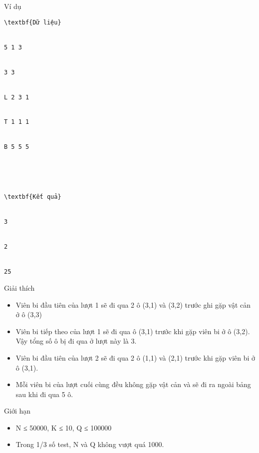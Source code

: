 Ví dụ
\begin{verbatim}
\textbf{Dữ liệu}


5 1 3


3 3


L 2 3 1


T 1 1 1


B 5 5 5





\textbf{Kết quả}


3


2


25\end{verbatim}
Giải thích
\begin{itemize}
	\item     Viên bi đầu tiên của lượt 1 sẽ đi qua 2 ô (3,1) và (3,2) trước ghi gặp vật cản ở ô (3,3)   
	\item     Viên bi tiếp theo của lượt 1 sẽ đi qua ô (3,1) trước khi gặp viên bi ở ô (3,2). Vậy tổng số ô bị đi qua ở lượt này là 3.   
	\item     Viên bi đầu tiên của lượt 2 sẽ đi qua 2 ô (1,1) và (2,1) trước khi gặp viên bi ở ô (3,1).   
	\item     Mỗi viên bi của lượt cuối cùng đều không gặp vật cản và sẽ đi ra ngoài bảng sau khi đi qua 5 ô.   
\end{itemize}
Giới hạn
\begin{itemize}
	\item     N ≤ 50000, K ≤ 10, Q ≤ 100000   
	\item     Trong 1/3 số test, N và Q không vượt quá 1000.   
\end{itemize}